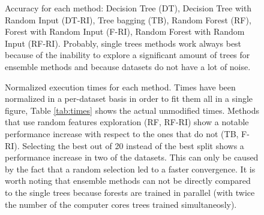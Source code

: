 \documentclass[a4paper,10pt]{article}
\begin{document}
\begin{figure}[H]
\caption{Accuracy for each method: Decision Tree (DT), Decision Tree with Random Input (DT-RI), Tree bagging (TB), Random Forest (RF), Forest with Random Input (F-RI), Random Forest with Random Input (RF-RI). Probably, single trees methods work always best because of the inability to explore a significant amount of trees for ensemble methods and because datasets do not have a lot of noise.}
\label{fig:accuracy}
\end{figure}
\begin{figure}[H]
\caption{Normalized execution times for each method. Times have been normalized in a per-dataset basis in order to fit them all in a single figure, Table \ref{tab:times} shows the actual unmodified times. Methods that use random features exploration (RF, RF-RI) show a notable performance increase with respect to the ones that do not (TB, F-RI). Selecting the best out of 20 instead of the best split shows a performance increase in two of the datasets. This can only be caused by the fact that a random selection led to a faster convergence. It is worth noting that ensemble methods can not be directly compared to the single trees because forests are trained in parallel (with twice the number of the computer cores trees trained simultaneosly).}
\label{fig:times}
\end{figure}
\end{document}
